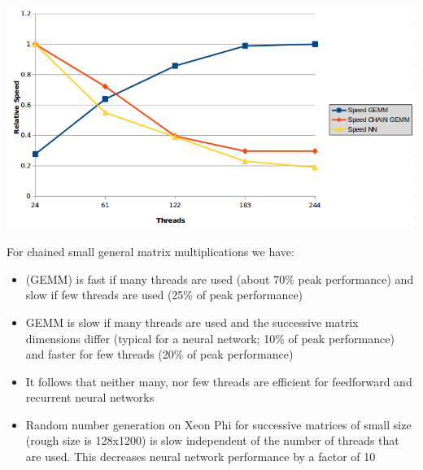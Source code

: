 \documentclass[a4paper,17pt]{extarticle}%
\newcommand{\newpart}[1]
{\colorbox[rgb]{1.0000, 0.9020, 0.4549}{\makebox[0.97\columnwidth]
    {\rule[-1.2ex]{0pt}{3.7ex}\partfont{#1}}}\bigskip}
\newcommand{\partfont}[1]{{\Large \textsf{\textbf{#1}}}}
\begin{document}
{{\begin{multicols}{2}
{} %
 \columnbreak


%
%

\newpart{Results}

\begin{minipage}{0.33\textwidth}
	\begin{center}
		\includegraphics[width=1.3\linewidth]{figures/gemm.png}
	\end{center}
\end{minipage}

For chained small general matrix multiplications we have:
\begin{itemize}
	\item (GEMM) is fast if many threads are used (about 70\% peak performance) and slow if few threads are used (25\% of peak performance)
	\item GEMM is slow if many threads are used and the successive matrix dimensions differ (typical for a neural network; 10\% of peak performance) and faster for few threads (20\% of peak performance)
	\item It follows that neither many, nor few threads are efficient for feedforward and recurrent neural networks
	\item Random number generation on Xeon Phi for successive matrices of small size (rough size is 128x1200) is slow independent of the number of threads that are used. This decreases neural network performance by a factor of 10
\end{itemize}


\end{multicols}

   } %

} %
\end{document}
